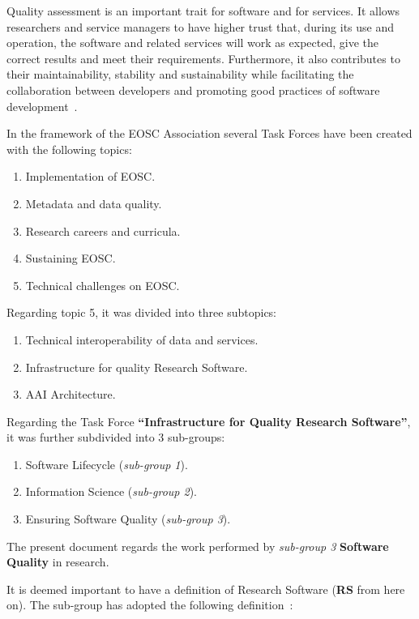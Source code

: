 Quality assessment is an important trait for software and for services. It allows researchers and service managers to have higher trust that, during its use and operation, the software and related services will work as expected, give the correct results and meet their requirements. Furthermore, it also contributes to their maintainability, stability and sustainability while facilitating the collaboration between developers and promoting good practices of software development~\cite{eosc_synergyD31}.

In the framework of the EOSC Association several Task Forces have been created with the following topics:

\begin{enumerate}
    \item Implementation of EOSC.
    \item Metadata and data quality.
    \item Research careers and curricula.
    \item Sustaining EOSC.
    \item Technical challenges on EOSC.
\end{enumerate}

Regarding topic 5, it was divided into three subtopics:

\begin{enumerate}
    \item Technical interoperability of data and services.
    \item Infrastructure for quality Research Software.
    \item AAI Architecture.
\end{enumerate}

Regarding the Task Force \textbf{``Infrastructure for Quality Research Software''}, it was further subdivided into 3 sub-groups:

\begin{enumerate}
    \item Software Lifecycle (\textit{sub-group 1}).
    \item Information Science (\textit{sub-group 2}).
    \item Ensuring Software Quality (\textit{sub-group 3}).
\end{enumerate}

The present document regards the work performed by \textit{sub-group 3} \textbf{Software Quality} in research.

It is deemed important to have a definition of Research Software (\textbf{RS} from here on). The sub-group has adopted the following definition~\cite{gruenpeter_defining_2021}: 

